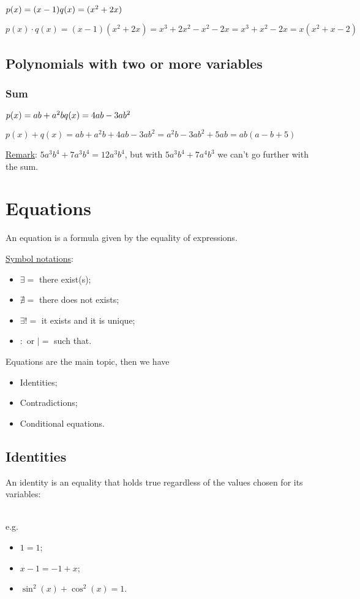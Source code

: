 \documentclass{article}
\newcommand{\figbox}[1]{ 
    \begin{figure*}[ht!]        
        \begin{center}            
            \fbox{#1}        
        \end{center}    
    \end{figure*}
}
\begin{document}
$p(x)=(x-1)\\
q(x)=(x^2+2x)$

$p(x)\cdot q(x)=(x-1)(x^2+2x)=x^3+2x^2-x^2-2x=x^3+x^2-2x=x(x^2+x-2)$

\subsection{Polynomials with two or more variables}
\subsubsection{Sum}
$p(x)=ab+a^2b\\
q(x)=4ab-3ab^2$

$p(x)+q(x)=ab+a^2b+4ab-3ab^2=a^2b-3ab^2+5ab=ab(a-b+5)$

\underline{Remark}: $5a^3b^4+7a^3b^4=12a^3b^4$, but with $5a^3b^4+7a^4b^3$ we can't go further with the sum.

\section{Equations}
An equation is a formula given by the equality of expressions.

\underline{Symbol notations}: 
\begin{itemize}
    \item $\exists =$ there exist(s);
    \item $\nexists =$ there does not exists;
    \item $\exists! =$ it exists and it is unique;
    \item $:$ or $| =$ such that.
\end{itemize}

Equations are the main topic, then we have
\begin{itemize}
    \item Identities;
    \item Contradictions;
    \item Conditional equations.
\end{itemize}

\newpage
\subsection{Identities}    
An identity is an equality that holds true regardless of the values chosen for its variables:
\figbox{$\forall x \in \mathbb{R},\ \exists y \in \mathbb{R}\ |\ f(x,y)=0$}\\
e.g.
\begin{itemize}
    \item $1=1$;
    \item $x-1=-1+x$;
    \item $\sin^2(x)+\cos^2(x)=1$.
\end{itemize}
\end{document}
